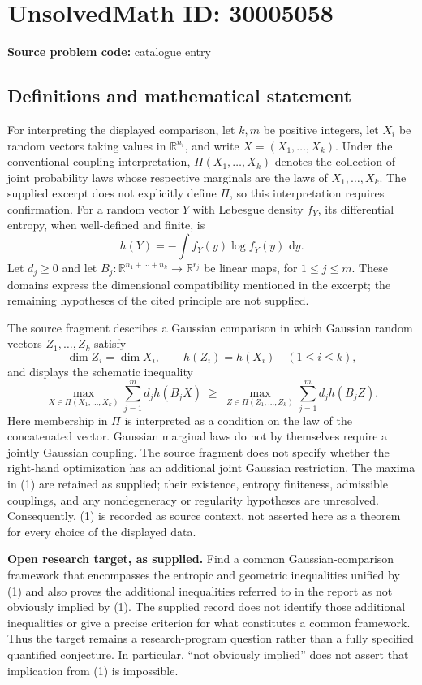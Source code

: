\documentclass[11pt]{article}
\newcommand{\R}{\mathbb{R}}
\newcommand{\dd}{\,\mathrm{d}}
\begin{document}
\section*{UnsolvedMath ID: 30005058}
\textbf{Source problem code:} catalogue entry
\subsection{Definitions and mathematical statement}
For interpreting the displayed comparison, let \(k,m\) be positive integers, let \(X_i\) be random vectors taking values in \(\R^{n_i}\), and write \(X=(X_1,\ldots,X_k)\). Under the conventional coupling interpretation, \(\Pi(X_1,\ldots,X_k)\) denotes the collection of joint probability laws whose respective marginals are the laws of \(X_1,\ldots,X_k\). The supplied excerpt does not explicitly define \(\Pi\), so this interpretation requires confirmation. For a random vector \(Y\) with Lebesgue density \(f_Y\), its differential entropy, when well-defined and finite, is
\[
h(Y)=-\int f_Y(y)\log f_Y(y)\,\dd y.
\]
Let \(d_j\geq 0\) and let \(B_j:\R^{n_1+\cdots+n_k}\to\R^{r_j}\) be linear maps, for \(1\leq j\leq m\). These domains express the dimensional compatibility mentioned in the excerpt; the remaining hypotheses of the cited principle are not supplied.

The source fragment describes a Gaussian comparison in which Gaussian random vectors \(Z_1,\ldots,Z_k\) satisfy
\[
\dim Z_i=\dim X_i,\qquad h(Z_i)=h(X_i)\quad(1\leq i\leq k),
\]
and displays the schematic inequality
\begin{equation}
\max_{X\in\Pi(X_1,\ldots,X_k)}\sum_{j=1}^{m}d_jh(B_jX)
\;\geq\;
\max_{Z\in\Pi(Z_1,\ldots,Z_k)}\sum_{j=1}^{m}d_jh(B_jZ).
\tag{1}
\end{equation}
Here membership in \(\Pi\) is interpreted as a condition on the law of the concatenated vector. Gaussian marginal laws do not by themselves require a jointly Gaussian coupling. The source fragment does not specify whether the right-hand optimization has an additional joint Gaussian restriction. The maxima in (1) are retained as supplied; their existence, entropy finiteness, admissible couplings, and any nondegeneracy or regularity hypotheses are unresolved. Consequently, (1) is recorded as source context, not asserted here as a theorem for every choice of the displayed data.

\textbf{Open research target, as supplied.} Find a common Gaussian-comparison framework that encompasses the entropic and geometric inequalities unified by (1) and also proves the additional inequalities referred to in the report as not obviously implied by (1). The supplied record does not identify those additional inequalities or give a precise criterion for what constitutes a common framework. Thus the target remains a research-program question rather than a fully specified quantified conjecture. In particular, ``not obviously implied'' does not assert that implication from (1) is impossible.
\end{document}
